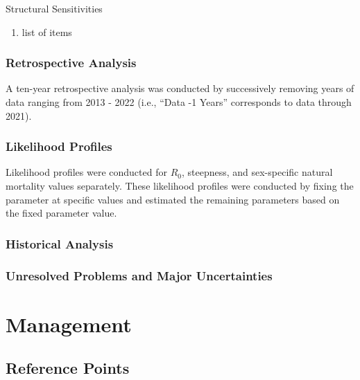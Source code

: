 \documentclass[11pt,
  english,
  letterpaper,
]{article}
\begin{document}
Structural Sensitivities

\begin{enumerate}
   
  \item  list of items

\end{enumerate}

\hypertarget{retrospective-analysis}{%
\subsubsection{Retrospective Analysis}\label{retrospective-analysis}}

A ten-year retrospective analysis was conducted by successively removing years of data ranging from 2013 - 2022 (i.e., ``Data -1 Years'' corresponds to data through 2021).

\hypertarget{likelihood-profiles}{%
\subsubsection{Likelihood Profiles}\label{likelihood-profiles}}

Likelihood profiles were conducted for \(R_0\), steepness, and sex-specific natural mortality values separately. These likelihood profiles were conducted by fixing the parameter at specific values and estimated the remaining parameters based on the fixed parameter value.

\hypertarget{historical-analysis}{%
\subsubsection{Historical Analysis}\label{historical-analysis}}

\hypertarget{unresolved-problems-and-major-uncertainties-1}{%
\subsubsection{Unresolved Problems and Major Uncertainties}\label{unresolved-problems-and-major-uncertainties-1}}

\hypertarget{management}{%
\section{Management}\label{management}}

\hypertarget{reference-points-2}{%
\subsection{Reference Points}\label{reference-points-2}}
\end{document}
